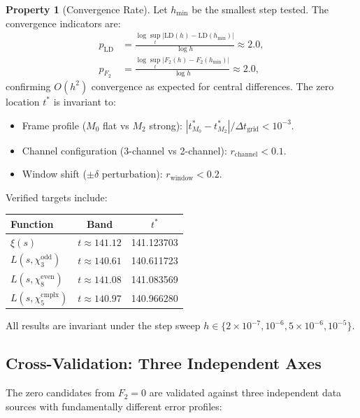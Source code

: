 \documentclass[11pt, a4paper]{article}
\theoremstyle{definition}
\newtheorem{property}{Property}[section]
\theoremstyle{plain}
\newcommand{\xif}{\xi}                      %
\begin{document}
\begin{property}[Convergence Rate]
\label{prop:convergence}
Let $h_{\min}$ be the smallest step tested. The convergence indicators are:
\begin{align}
  p_{\mathrm{LD}} &= \frac{\log\sup_t|\mathrm{LD}(h) - \mathrm{LD}(h_{\min})|}
  {\log h} \approx 2.0, \label{eq:conv_ld}\\
  p_{F_2} &= \frac{\log\sup_t|F_2(h) - F_2(h_{\min})|}
  {\log h} \approx 2.0, \label{eq:conv_f2}
\end{align}
confirming $O(h^2)$ convergence as expected for central differences.
The zero location $t^*$ is invariant to:
\begin{itemize}
  \item Frame profile ($M_0$ flat vs $M_2$ strong): $|t^*_{M_0} - t^*_{M_2}| / \Delta t_{\mathrm{grid}} < 10^{-3}$.
  \item Channel configuration (3-channel vs 2-channel): $r_{\mathrm{channel}} < 0.1$.
  \item Window shift ($\pm\delta$ perturbation): $r_{\mathrm{window}} < 0.2$.
\end{itemize}
\end{property}

Verified targets include:
\begin{center}
\begin{tabular}{lcc}
\toprule
\textbf{Function} & \textbf{Band} & \textbf{$t^*$} \\
\midrule
$\xif(s)$ & $t \approx 141.12$ & 141.123703 \\
$L(s,\chi_3^{\mathrm{odd}})$ & $t \approx 140.61$ & 140.611723 \\
$L(s,\chi_8^{\mathrm{even}})$ & $t \approx 141.08$ & 141.083569 \\
$L(s,\chi_5^{\mathrm{cmplx}})$ & $t \approx 140.97$ & 140.966280 \\
\bottomrule
\end{tabular}
\end{center}
All results are invariant under the step sweep $h \in \{2\times10^{-7},
10^{-6}, 5\times10^{-6}, 10^{-5}\}$.


\subsection{Cross-Validation: Three Independent Axes}
\label{sec:cross_validation}

The zero candidates from $F_2 = 0$ are validated against three independent
data sources with fundamentally different error profiles:
\end{document}
